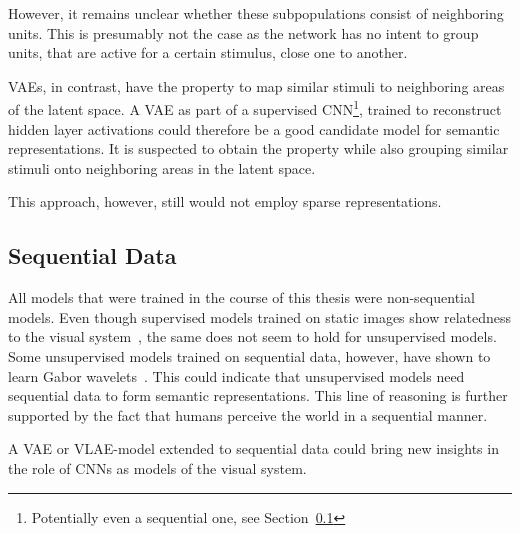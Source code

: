 However, it remains unclear whether these subpopulations consist of neighboring units.
This is presumably not the case as the network has no intent to group units, that are active for a certain stimulus, close one to another.

\acfp{VAE}, in contrast, have the property to map similar stimuli to neighboring areas of the latent space.
A \ac{VAE} as part of a supervised \ac{CNN}\footnote{Potentially even a sequential one, see Section~\ref{subsec:sequential-data}}, trained to reconstruct hidden layer activations could therefore be a good candidate model for semantic representations.
It is suspected to obtain the  property while also grouping similar stimuli onto neighboring areas in the latent space.

This approach, however, still would not employ sparse representations.

\subsection{Sequential Data}\label{subsec:sequential-data}

All models that were trained in the course of this thesis were non-sequential models.
Even though supervised models trained on static images show relatedness to the visual system~\citep{khaligh2014deep,cadieu2014deep,krizhevsky2012imagenet}, the same does not seem to hold for unsupervised models.
Some unsupervised models trained on sequential data, however, have shown to learn Gabor wavelets~\citep{berkes2005slow,palm2012prediction}.
This could indicate that unsupervised models need sequential data to form semantic representations.
This line of reasoning is further supported by the fact that humans perceive the world in a sequential manner.

A \ac{VAE} or \ac{VLAE}-model extended to sequential data could bring new insights in the role of \acp{CNN} as models of the visual system.